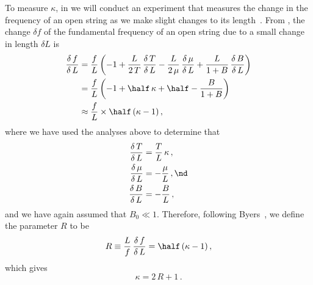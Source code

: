 
To measure $\kappa$, in  we will conduct an experiment that measures the change in the frequency of an open string as we make slight changes to its length~\cite{ref:byers1996cgi,ref:varieschi2010icf}. From , the change $\delta f$ of the fundamental frequency of an open string due to a small  change in length $\delta L$ is
 \begin{equation}
 \begin{split}
\frac{\delta\, f}{\delta\, L} &= \frac{f}{L} \left( -1 + \frac{L}{2\, T}\, \frac{\delta\, T}{\delta\, L} - \frac{L}{2\, \mu}\, \frac{\delta\, \mu}{\delta\, L} + \frac{L}{1 + B}\, \frac{\delta\, B}{\delta\, L} \right) \\
&= \frac{f}{L} \left( -1 + \half\, \kappa + \half - \frac{B}{1 + B} \right) \\
&\approx \frac{f}{L} \times \half\, (\kappa - 1)\, ,
 \end{split}
 \end{equation}
where we have used the analyses above to determine that
 \begin{subequations}
 \begin{align}
\frac{\delta\, T}{\delta\, L} &= \frac{T}{L}\, \kappa\, , \\
\frac{\delta\, \mu}{\delta\, L} &= -\frac{\mu}{L}\, , \nd \\
\frac{\delta\, B}{\delta\, L} &= -\frac{B}{L}\, , \\
 \end{align}
 \end{subequations}
and we have again assumed that $B_0 \ll 1$. Therefore, following Byers~\cite{ref:byers1996cgi,ref:varieschi2010icf}, we define the parameter $R$ to be
 \begin{equation}\label{eqn:r_def}
R \equiv \frac{L}{f}\, \frac{\delta\, f}{\delta\, L} = \half\, (\kappa - 1)\, ,
 \end{equation}
which gives
 \begin{equation} \label{eqn:kappa_r}
\kappa = 2\, R + 1\, .
 \end{equation}

